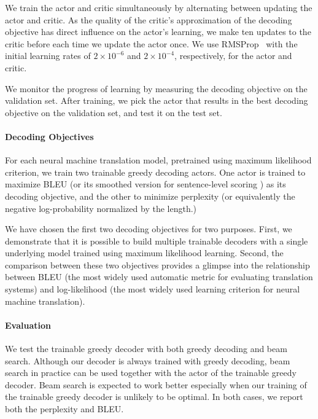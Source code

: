 We train the actor and critic simultaneously by alternating between updating the actor and critic. As the quality of the critic's approximation of the decoding objective has direct influence on the actor's learning, we make ten updates to the critic before each time we update the actor once. We use RMSProp~\citep{tieleman2012lecture} with the initial learning rates of $2\times 10^{-6}$ and $2\times 10^{-4}$, respectively, for the actor and critic. 

We monitor the progress of learning by measuring the decoding objective on the validation set. After training, we pick the actor that results in the best decoding objective on the validation set, and test it on the test set.



\paragraph{Decoding Objectives}

For each neural machine translation model, pretrained using maximum likelihood criterion, we train two trainable greedy decoding actors. One actor is trained to maximize BLEU (or its smoothed version for sentence-level scoring \citep{lin2004automatic}) as its decoding objective, and the other to minimize perplexity (or equivalently the negative log-probability normalized by the length.) %

We have chosen the first two decoding objectives for two purposes. First, we demonstrate that it is possible to build multiple trainable decoders with a single underlying model trained using maximum likelihood learning. Second, the comparison between these two objectives provides a glimpse into the relationship between BLEU (the most widely used automatic metric for evaluating translation systems) and log-likelihood (the most widely used learning criterion for neural machine translation).%
\paragraph{Evaluation}
We test the trainable greedy decoder with both greedy decoding and beam search. Although our decoder is always trained with greedy decoding, beam search in practice can be used together with the actor of the trainable greedy decoder. Beam search is expected to work better especially when our training of the trainable greedy decoder is unlikely to be optimal. In both cases, we report both the perplexity and BLEU.


